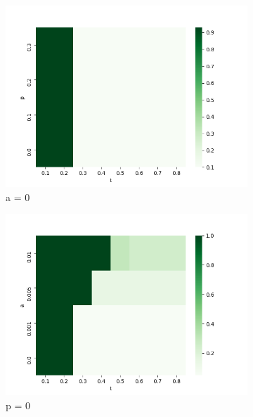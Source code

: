 \documentclass{article}
\begin{document}
\begin{figure}[h]
	\begin{subfigure}[b]{0.5\textwidth}
		\includegraphics[width=\textwidth]{../Images/hm01.png}
		\caption{a = 0}
		\label{fig:hm01}
	\end{subfigure}
	\hfill
	\begin{subfigure}[b]{0.5\textwidth}
		\includegraphics[width=\textwidth]{../Images/hm02.png}
		\caption{p = 0}
		\label{fig:hm02}
	\end{subfigure}
	\hfill
	\begin{subfigure}[b]{0.5\textwidth}

\end{subfigure}
\end{figure}
\end{document}
